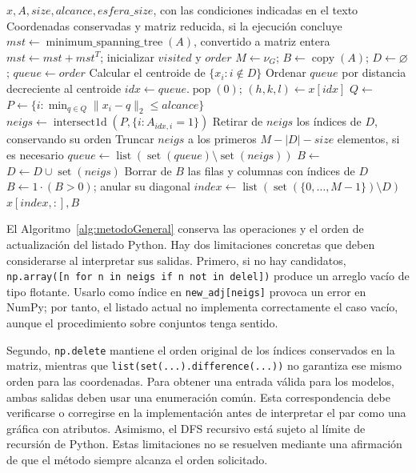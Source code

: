 \begin{algorithm}[H]
\caption{Método general de reducción: operaciones de \texttt{sampling}}
\label{alg:metodoGeneral}
\begin{algorithmic}[1]
\Require $x,A,size,alcance,esfera\_size$, con las condiciones indicadas en el texto
\Ensure Coordenadas conservadas y matriz reducida, si la ejecución concluye
\State $mst\gets\operatorname{minimum\_spanning\_tree}(A)$, convertido a matriz entera
\State $mst\gets mst+mst^T$; inicializar $visited$ y $order$
\State {}
\State $M\gets\nu_G$; $B\gets\operatorname{copy}(A)$; $D\gets\varnothing$; $queue\gets order$
        \State Calcular el centroide de $\{x_i:i\notin D\}$
        \State Ordenar $queue$ por distancia decreciente al centroide
    \EndIf
    \State $idx\gets queue.\operatorname{pop}(0)$; $(h,k,l)\gets x[idx]$
    \State $Q\gets$ 
    \State $P\gets\{i:\min_{q\in Q}\|x_i-q\|_2\leq alcance\}$
    \State $neigs\gets\operatorname{intersect1d}(P,\{i:A_{idx,i}=1\})$
    \State Retirar de $neigs$ los índices de $D$, conservando su orden
    \State Truncar $neigs$ a los primeros $M-|D|-size$ elementos, si es necesario
    \State $queue\gets\operatorname{list}(\operatorname{set}(queue)\setminus\operatorname{set}(neigs))$
    \State $B\gets$ 
    \State $D\gets D\cup\operatorname{set}(neigs)$
\EndWhile
\State Borrar de $B$ las filas y columnas con índices de $D$
\State $B\gets1\cdot(B>0)$; anular su diagonal
\State $index\gets\operatorname{list}(\operatorname{set}(\{0,\ldots,M-1\})\setminus D)$
\State \Return $x[index,:],B$
\end{algorithmic}
\end{algorithm}

El Algoritmo~\ref{alg:metodoGeneral} conserva las operaciones y el orden de actualización del listado Python. Hay dos limitaciones concretas que deben considerarse al interpretar sus salidas. Primero, si no hay candidatos, \texttt{np.array([n for n in neigs if n not in delel])} produce un arreglo vacío de tipo flotante. Usarlo como índice en \texttt{new\_adj[neigs]} provoca un error en NumPy; por tanto, el listado actual no implementa correctamente el caso vacío, aunque el procedimiento sobre conjuntos tenga sentido.

Segundo, \texttt{np.delete} mantiene el orden original de los índices conservados en la matriz, mientras que \texttt{list(set(...).difference(...))} no garantiza ese mismo orden para las coordenadas. Para obtener una entrada válida para los modelos, ambas salidas deben usar una enumeración común. Esta correspondencia debe verificarse o corregirse en la implementación antes de interpretar el par como una gráfica con atributos. Asimismo, el DFS recursivo está sujeto al límite de recursión de Python. Estas limitaciones no se resuelven mediante una afirmación de que el método siempre alcanza el orden solicitado.

